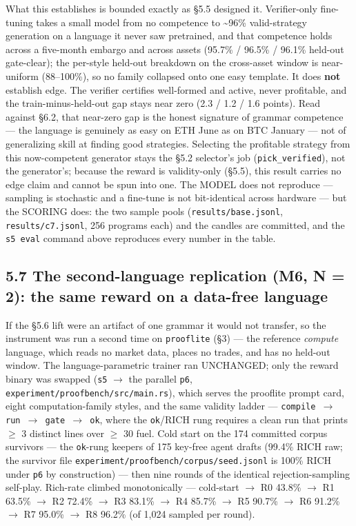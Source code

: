 \documentclass[11pt]{article}
\newcommand{\code}[1]{\texttt{#1}}
\begin{document}
What this establishes is bounded exactly as \S{}5.5 designed it. Verifier-only
fine-tuning takes a small model from no competence to \textasciitilde{}96\% valid-strategy
generation on a language it never saw pretrained, and that competence holds
across a five-month embargo and across assets (95.7\% / 96.5\% / 96.1\% held-out
gate-clear); the per-style held-out breakdown on the cross-asset window is
near-uniform (88--100\%), so no family collapsed onto one easy template. It does
\textbf{not} establish edge. The verifier certifies well-formed and active, never
profitable, and the train-minus-held-out gap stays near zero (2.3 / 1.2 / 1.6
points). Read against \S{}6.2, that near-zero gap is the honest signature of grammar
competence --- the language is genuinely as easy on ETH June as on BTC January ---
not of generalizing skill at finding good strategies. Selecting the profitable
strategy from this now-competent generator stays the \S{}5.2 selector's job
(\code{pick\_verified}), not the generator's; because the reward is validity-only
(\S{}5.5), this result carries no edge claim and cannot be spun into one. The MODEL
does not reproduce --- sampling is stochastic and a fine-tune is not bit-identical
across hardware --- but the SCORING does: the two sample pools
(\code{results/base.jsonl}, \code{results/c7.jsonl}, 256 programs each) and the candles
are committed, and the \code{s5 eval} command above reproduces every number in the
table.

\subsection*{5.7 The second-language replication (M6, N = 2): the same reward on a data-free language}

If the \S{}5.6 lift were an artifact of one grammar it would not transfer, so the
instrument was run a second time on \code{prooflite} (\S{}3) --- the reference \emph{compute}
language, which reads no market data, places no trades, and has no held-out
window. The language-parametric trainer ran UNCHANGED; only the reward binary
was swapped (\code{s5} $\rightarrow$ the parallel \code{p6}, \code{experiment/proofbench/src/main.rs}),
which serves the prooflite prompt card, eight computation-family styles, and the
same validity ladder --- \code{compile $\rightarrow$ run $\rightarrow$ gate $\rightarrow$ ok}, where the \code{ok}/RICH rung
requires a clean run that prints $\ge$ 3 distinct lines over $\ge$ 30 fuel. Cold start on
the 174 committed corpus survivors --- the \code{ok}-rung keepers of 175 key-free agent
drafts (99.4\% RICH raw; the survivor file
\code{experiment/proofbench/corpus/seed.jsonl} is 100\% RICH under \code{p6} by
construction) --- then nine rounds of the identical rejection-sampling self-play.
Rich-rate climbed monotonically --- cold-start $\rightarrow$ R0
43.8\% $\rightarrow$ R1 63.5\% $\rightarrow$ R2 72.4\% $\rightarrow$ R3 83.1\% $\rightarrow$ R4 85.7\% $\rightarrow$ R5 90.7\% $\rightarrow$ R6 91.2\% $\rightarrow$ R7
95.0\% $\rightarrow$ R8 96.2\% (of 1,024 sampled per round).
\end{document}
